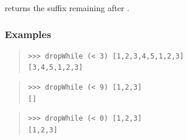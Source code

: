 \begin{haddockdesc}
\item[\begin{tabular}{@{}l}
dropWhile :: (a -> Bool) -> {\char 91}a{\char 93} -> {\char 91}a{\char 93}
\end{tabular}]
{\haddockbegindoc
{}  returns the suffix remaining after  .\par
\subsubsection*{\textbf{Examples}}
\begin{quote}
{\haddockverb\begin{verbatim}
>>> dropWhile (< 3) [1,2,3,4,5,1,2,3]
[3,4,5,1,2,3]

\end{verbatim}}
\end{quote}
\begin{quote}
{\haddockverb\begin{verbatim}
>>> dropWhile (< 9) [1,2,3]
[]

\end{verbatim}}
\end{quote}
\begin{quote}
{\haddockverb\begin{verbatim}
>>> dropWhile (< 0) [1,2,3]
[1,2,3]

\end{verbatim}}
\end{quote}}
\end{haddockdesc}
